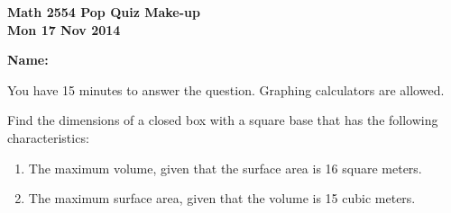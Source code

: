 \documentclass[11pt,letterpaper]{article}
\begin{document}
\flushleft
\begin{multicols}{2}

\begin{large}\textbf{Math 2554 Pop Quiz Make-up \\
Mon 17 Nov 2014}\end{large}

\hfill\textbf{Name:  }\underline{\hspace{40ex}} %

\vspace{.5in}

\end{multicols}

\pagestyle{empty}

\flushleft

You have 15 minutes to answer the question.  Graphing calculators are allowed.  

\vspace{3pc}
Find the dimensions of a closed box with a square base that has the following characteristics:

\begin{enumerate}
\item The maximum volume, given that the surface area is  16 square meters.

\vspace{22pc}
\item The maximum surface area, given that the volume is 15 cubic meters.

\end{enumerate}
\end{document}

